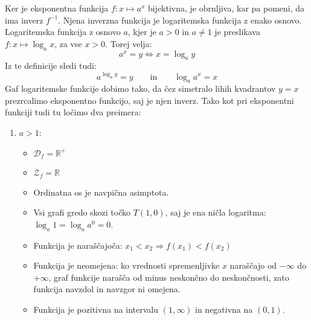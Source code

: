 Ker je eksponentna funkcija  $f: x \mapsto a^x$ bijektivna, je obrnljiva, kar pa pomeni, da ima inverz $f^{-1}$. Njena inverzna funkcija je logaritemska funkcija z enako osnovo. Logaritemska funkcija z osnovo $a$, kjer je $a > 0$ in $a \neq 1$ je preslikava $f: x \mapsto \log_a{x}$, za vse $x > 0$. Torej velja:
\begin{equation*}
a^x=y \Leftrightarrow x=\log_a{y}
\end{equation*}
%
Iz te definicije sledi tudi: 
\begin{equation*}
a^{\log_a{y}} = y \qquad \text{in} \qquad \log_a{a^x} = x
\end{equation*}
%
Gaf logaritemske funkcije dobimo tako, da čez simetralo lihih kvadrantov $y=x$ prezrcalimo eksponentno funkcijo, saj je njen inverz. Tako kot pri eksponentni funkciji tudi tu ločimo dva preimera:
\begin{enumerate}
\item $a>1$:
%
\begin{itemize}
\item  $\mathcal{D}_f = \mathbb{R}^+$
\item $\mathcal{Z}_f = \mathbb{R}$
\item Ordinatna os je navpična asimptota.
\item Vsi grafi gredo skozi točko $T(1, 0)$, saj je ena ničla logaritma: $\log_a{1}=\log_a{a^0}
=0$.
\item Funkcija je naraščajoča: $x_1 < x_2 \Rightarrow f(x_1) < f(x_2)$
\item Funkcija je neomejena: ko vrednosti spremenljivke $x$ naraščajo od $-\infty$ do $+\infty$, graf funkcije narašča od minus neskončno do neskončnosti, zato funkcija navzdol in navzgor ni omejena.
\item Funkcija je pozitivna na intervalu $(1, \infty)$ in negativna na $(0, 1)$.
%
\begin{figure}[h]
\centering
{}
\end{figure}
\end{itemize}
\end{enumerate}
